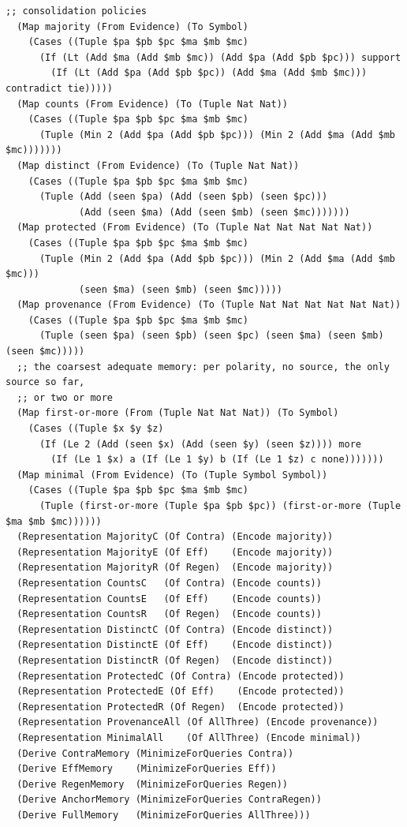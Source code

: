 \documentclass[11pt]{article}
\theoremstyle{definition}
\theoremstyle{plain}
\begin{document}
\begin{lstlisting}[style=mettamod]
  ;; consolidation policies
  (Map majority (From Evidence) (To Symbol)
    (Cases ((Tuple $pa $pb $pc $ma $mb $mc)
      (If (Lt (Add $ma (Add $mb $mc)) (Add $pa (Add $pb $pc))) support
        (If (Lt (Add $pa (Add $pb $pc)) (Add $ma (Add $mb $mc))) contradict tie)))))
  (Map counts (From Evidence) (To (Tuple Nat Nat))
    (Cases ((Tuple $pa $pb $pc $ma $mb $mc)
      (Tuple (Min 2 (Add $pa (Add $pb $pc))) (Min 2 (Add $ma (Add $mb $mc)))))))
  (Map distinct (From Evidence) (To (Tuple Nat Nat))
    (Cases ((Tuple $pa $pb $pc $ma $mb $mc)
      (Tuple (Add (seen $pa) (Add (seen $pb) (seen $pc)))
             (Add (seen $ma) (Add (seen $mb) (seen $mc)))))))
  (Map protected (From Evidence) (To (Tuple Nat Nat Nat Nat Nat))
    (Cases ((Tuple $pa $pb $pc $ma $mb $mc)
      (Tuple (Min 2 (Add $pa (Add $pb $pc))) (Min 2 (Add $ma (Add $mb $mc)))
             (seen $ma) (seen $mb) (seen $mc)))))
  (Map provenance (From Evidence) (To (Tuple Nat Nat Nat Nat Nat Nat))
    (Cases ((Tuple $pa $pb $pc $ma $mb $mc)
      (Tuple (seen $pa) (seen $pb) (seen $pc) (seen $ma) (seen $mb) (seen $mc)))))
  ;; the coarsest adequate memory: per polarity, no source, the only source so far,
  ;; or two or more
  (Map first-or-more (From (Tuple Nat Nat Nat)) (To Symbol)
    (Cases ((Tuple $x $y $z)
      (If (Le 2 (Add (seen $x) (Add (seen $y) (seen $z)))) more
        (If (Le 1 $x) a (If (Le 1 $y) b (If (Le 1 $z) c none)))))))
  (Map minimal (From Evidence) (To (Tuple Symbol Symbol))
    (Cases ((Tuple $pa $pb $pc $ma $mb $mc)
      (Tuple (first-or-more (Tuple $pa $pb $pc)) (first-or-more (Tuple $ma $mb $mc))))))
  (Representation MajorityC (Of Contra) (Encode majority))
  (Representation MajorityE (Of Eff)    (Encode majority))
  (Representation MajorityR (Of Regen)  (Encode majority))
  (Representation CountsC   (Of Contra) (Encode counts))
  (Representation CountsE   (Of Eff)    (Encode counts))
  (Representation CountsR   (Of Regen)  (Encode counts))
  (Representation DistinctC (Of Contra) (Encode distinct))
  (Representation DistinctE (Of Eff)    (Encode distinct))
  (Representation DistinctR (Of Regen)  (Encode distinct))
  (Representation ProtectedC (Of Contra) (Encode protected))
  (Representation ProtectedE (Of Eff)    (Encode protected))
  (Representation ProtectedR (Of Regen)  (Encode protected))
  (Representation ProvenanceAll (Of AllThree) (Encode provenance))
  (Representation MinimalAll    (Of AllThree) (Encode minimal))
  (Derive ContraMemory (MinimizeForQueries Contra))
  (Derive EffMemory    (MinimizeForQueries Eff))
  (Derive RegenMemory  (MinimizeForQueries Regen))
  (Derive AnchorMemory (MinimizeForQueries ContraRegen))
  (Derive FullMemory   (MinimizeForQueries AllThree)))


\end{lstlisting}
\end{document}

